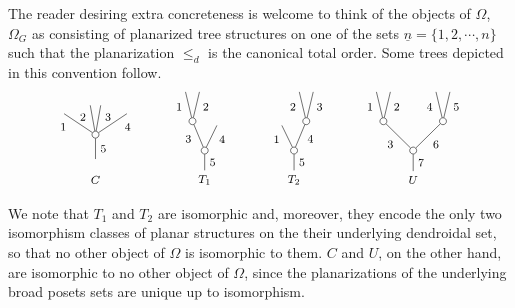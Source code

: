 \documentclass[a4paper,10pt]{article}%
\begin{document}
\begin{remark}\label{CONCRETETREE REM}
	The reader desiring extra concreteness is welcome to think of the objects of $\Omega$, $\Omega_G$ as consisting of planarized tree structures on one of the sets 
	$\underline{n} = \{1,2,\cdots,n\}$
such that the planarization $\leq_d$ is the canonical total order. Some trees depicted in this convention follow.
\begin{equation}\label{PLANAROMEGAEX1 EQ}
	\begin{tikzpicture}[grow=up,auto,level distance=2.1em,every node/.style = {font=\footnotesize},dummy/.style={circle,draw,inner sep=0pt,minimum size=1.75mm}]
		\node at (0,0) {$C$};
		\node at (0,0.4) {}
			child{node [dummy] {}
				child[sibling distance = 1.5em,level distance= 1.5em]{
				edge from parent node [swap,near end] {$4$}}
				child[sibling distance = 0.75em]{
				edge from parent node [swap, very near end] {$3$}}
				child[sibling distance = 0.75em]{
				edge from parent node [very near end] {$2$}}
				child[sibling distance = 1.5em,level distance= 1.5em]{
				edge from parent node [near end] {$1$}}
			edge from parent node [swap] {$5$}};
		\node at (2.75,0) {$T_1$}
			child{node [dummy] {}
				child[sibling distance = 1.75em, level distance=1.8em]{
				edge from parent node[swap, near end] {$4$}}
				child[sibling distance = 1.75em]{node [dummy] {}
					child[sibling distance = 1em]{
					edge from parent node [swap,near end] {$2$}}
					child[sibling distance = 1em]{
					edge from parent node [near end] {$1$}}
				edge from parent node [near end] {$3$}}
			edge from parent node [swap] {$5$}};
		\node at (5,0) {$T_2$}
			child{node [dummy] {}
				child[sibling distance = 1.75em]{node [dummy] {}
					child[sibling distance = 1em]{
					edge from parent node [swap,near end] {$3$}}
					child[sibling distance = 1em]{
					edge from parent node [near end] {$2$}}
				edge from parent node [swap,near end] {$4$}}
				child[sibling distance = 1.75em, level distance=1.8em]{
				edge from parent node[near end] {$1$}}
			edge from parent node [swap] {$5$}};
		\node at  (8,0) {$U$}
			child{node [dummy] {}
				child{node [dummy] {}
					child[sibling distance = 1em]{
					edge from parent node [swap,near end] {$5$}}
					child[sibling distance = 1em]{
					edge from parent node [near end] {$4$}}
				edge from parent node [swap] {$6$}}
				child{node [dummy] {}
					child[sibling distance = 1em]{
					edge from parent node [swap,near end] {$2$}}
					child[sibling distance = 1em]{
					edge from parent node [near end] {$1$}}
				edge from parent node {$3$}}
			edge from parent node [swap] {$7$}};
	\end{tikzpicture}
\end{equation}
\end{remark}
We note that $T_1$ and $T_2$ are isomorphic and, moreover, they encode the only two isomorphism classes of planar structures on the their underlying dendroidal set, so that no other object of $\Omega$ is isomorphic to them. $C$ and $U$, on the other hand, are isomorphic to no other object of $\Omega$, since the  planarizations of the underlying broad posets sets are unique up to isomorphism. 
\end{document}
